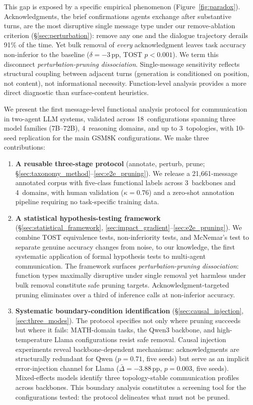 This gap is exposed by a specific empirical phenomenon (Figure~\ref{fig:paradox}). Acknowledgments, the brief confirmations agents exchange after substantive turns, are the most disruptive single message type under our remove-ablation criterion (\S\ref{sec:perturbation}): remove any one and the dialogue trajectory derails 91\% of the time. Yet bulk removal of \emph{every} acknowledgment leaves task accuracy non-inferior to the baseline ($\delta{=}{-}3$\,pp, TOST $p < 0.001$). We term this disconnect \emph{perturbation-pruning dissociation}. Single-message sensitivity reflects structural coupling between adjacent turns (generation is conditioned on position, not content), not informational necessity. Function-level analysis provides a more direct diagnostic than surface-content heuristics.

We present the first message-level functional analysis protocol for communication in two-agent LLM systems, validated across 18~configurations spanning three model families (7B--72B), 4~reasoning domains, and up to 3~topologies, with 10-seed replication for the main GSM8K configurations. We make three contributions:

\begin{enumerate}[nosep, leftmargin=*]
    \item \textbf{A reusable three-stage protocol} (annotate, perturb, prune; \S\ref{sec:taxonomy_method}--\ref{sec:e2e_pruning}). We release a 21{,}661-message annotated corpus with five-class functional labels across 3~backbones and 4~domains, with human validation ($\kappa = 0.76$) and a zero-shot annotation pipeline requiring no task-specific training data.

    \item \textbf{A statistical hypothesis-testing framework} (\S\ref{sec:statistical_framework}, \ref{sec:impact_gradient}--\ref{sec:e2e_pruning}). We combine TOST equivalence tests, non-inferiority tests, and McNemar's test to separate genuine accuracy changes from noise, to our knowledge, the first systematic application of formal hypothesis tests to multi-agent communication. The framework surfaces \emph{perturbation-pruning dissociation}: function types maximally disruptive under single removal yet harmless under bulk removal constitute safe pruning targets. Acknowledgment-targeted pruning eliminates over a third of inference calls at non-inferior accuracy.

    \item \textbf{Systematic boundary-condition identification} (\S\ref{sec:causal_injection}, \ref{sec:three_modes}). The protocol specifies not only where pruning succeeds but where it fails: MATH-domain tasks, the Qwen3 backbone, and high-temperature Llama configurations resist safe removal. Causal injection experiments reveal backbone-dependent mechanisms: acknowledgments are structurally redundant for Qwen ($p = 0.71$, five seeds) but serve as an implicit error-injection channel for Llama ($\bar{\Delta}{=}{-}3.88$\,pp, $p = 0.003$, five seeds). Mixed-effects models identify three topology-stable communication profiles across backbones. This boundary analysis constitutes a screening tool for the configurations tested: the protocol delineates what must not be pruned.
\end{enumerate}
